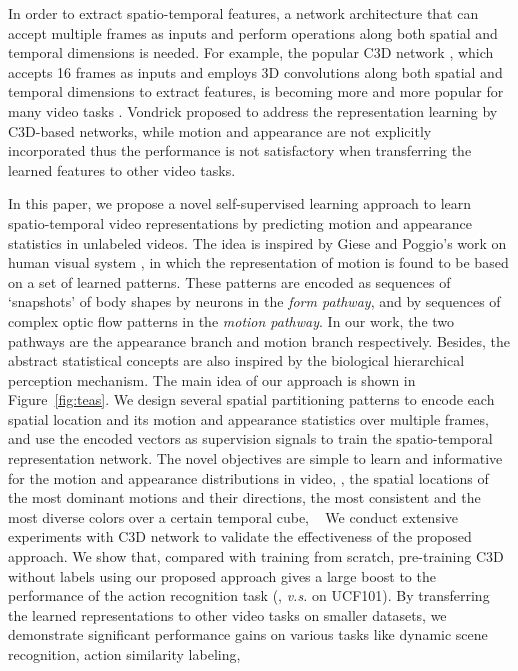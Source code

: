 \documentclass[10pt,twocolumn,letterpaper]{article}
\begin{document}
In order to extract spatio-temporal features, a network architecture that can accept multiple frames as inputs and perform operations along both spatial and temporal dimensions is needed. 
For example, the popular C3D network \cite{tran2015learning}, which accepts 16 frames as inputs and employs 3D convolutions along both spatial and temporal dimensions to extract features, is becoming more and more popular for many video tasks \cite{shou2017cdc, shou2016temporal, krishna2017dense, li2018jointly, wang2018bidirectional}. Vondrick \etal \cite{vondrick2016generating} proposed to address the representation learning by C3D-based networks, while motion and appearance are not explicitly incorporated thus the performance is not satisfactory when transferring the learned features to other video tasks. 

In this paper, we propose a novel self-supervised learning approach to learn spatio-temporal video representations by predicting motion and appearance statistics in unlabeled videos.
The idea is inspired by Giese and Poggio's work on human visual system \cite{giese2003cognitive}, in which the representation of motion is found to be based on a set of learned patterns. 
These patterns are encoded as sequences of ‘snapshots’ of body shapes by neurons in the \emph{form pathway}, and by sequences of complex optic flow patterns in the \emph{motion pathway}. 
In our work, the two pathways are the appearance branch and motion branch respectively. Besides, the abstract statistical concepts are also inspired by the biological hierarchical perception mechanism.
The main idea of our approach is shown in Figure~\ref{fig:teas}.
We design several spatial partitioning patterns to encode each spatial location and its motion and appearance statistics over multiple frames, and use the encoded vectors as supervision signals to train the spatio-temporal representation network. 
The novel objectives are simple to learn and informative for the motion and appearance distributions in video, \eg, the spatial locations of the most dominant motions and their directions, the most consistent and the most diverse colors over a certain temporal cube, 
\etc ~ 
We conduct extensive experiments with C3D network to validate the effectiveness of the proposed approach. We show that, compared with training from scratch, pre-training C3D without labels using our proposed approach gives a large boost to the performance of the action recognition task (\eg,  \emph{v.s.}  on UCF101).
By transferring the learned representations to other video tasks on smaller datasets, we demonstrate significant performance gains on various tasks like dynamic scene recognition, action similarity labeling, \etc
\end{document}
